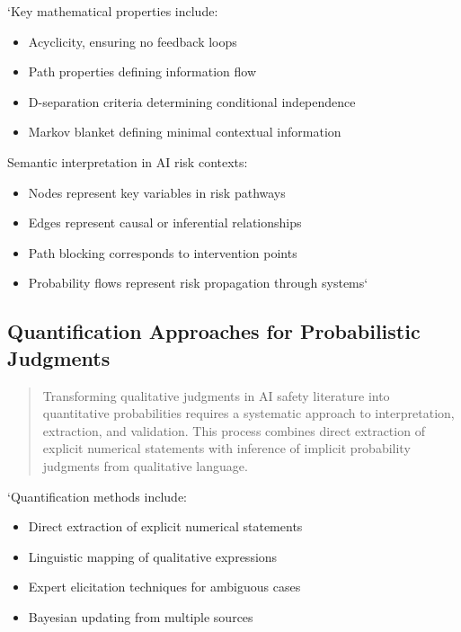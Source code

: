\documentclass[]{book}
\providecommand{\tightlist}{%
  \setlength{\itemsep}{0pt}\setlength{\parskip}{0pt}}
\begin{document}
`Key mathematical properties include:

\begin{itemize}
\tightlist
\item
  Acyclicity, ensuring no feedback loops
\item
  Path properties defining information flow
\item
  D-separation criteria determining conditional independence
\item
  Markov blanket defining minimal contextual information
\end{itemize}

Semantic interpretation in AI risk contexts:

\begin{itemize}
\tightlist
\item
  Nodes represent key variables in risk pathways
\item
  Edges represent causal or inferential relationships
\item
  Path blocking corresponds to intervention points
\item
  Probability flows represent risk propagation through systems`
\end{itemize}

\subsection{Quantification Approaches for Probabilistic
Judgments}\label{sec-quantification-approaches}

\begin{quote}
Transforming qualitative judgments in AI safety literature into
quantitative probabilities requires a systematic approach to
interpretation, extraction, and validation. This process combines direct
extraction of explicit numerical statements with inference of implicit
probability judgments from qualitative language.
\end{quote}

`Quantification methods include:

\begin{itemize}
\tightlist
\item
  Direct extraction of explicit numerical statements
\item
  Linguistic mapping of qualitative expressions
\item
  Expert elicitation techniques for ambiguous cases
\item
  Bayesian updating from multiple sources
\end{itemize}
\end{document}
